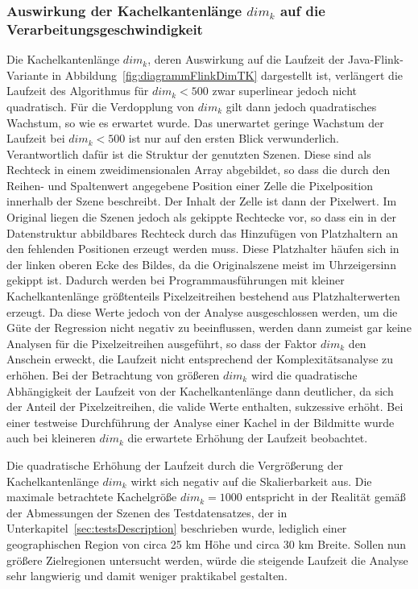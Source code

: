 \subsubsection{Auswirkung der Kachelkantenlänge $dim_k$ auf die Verarbeitungsgeschwindigkeit}
Die Kachelkantenlänge $dim_k$, deren Auswirkung auf die Laufzeit der Java-Flink-Variante in Abbildung~\ref{fig:diagrammFlinkDimTK} dargestellt ist, verlängert die Laufzeit des Algorithmus für $dim_k < 500$ zwar superlinear jedoch nicht quadratisch. Für die Verdopplung von $dim_k$ gilt dann jedoch quadratisches Wachstum, so wie es erwartet wurde. Das unerwartet geringe Wachstum der Laufzeit bei $dim_k < 500$ ist nur auf den ersten Blick verwunderlich. Verantwortlich dafür ist die Struktur der genutzten Szenen. Diese sind als Rechteck in einem zweidimensionalen Array abgebildet, so dass die durch den Reihen- und Spaltenwert angegebene Position einer Zelle die Pixelposition innerhalb der Szene beschreibt. Der Inhalt der Zelle ist dann der Pixelwert. Im Original liegen die Szenen jedoch als gekippte Rechtecke vor, so dass ein in der Datenstruktur abbildbares Rechteck durch das Hinzufügen von Platzhaltern an den fehlenden Positionen erzeugt werden muss. Diese Platzhalter häufen sich in der linken oberen Ecke des Bildes, da die Originalszene meist im Uhrzeigersinn gekippt ist. Dadurch werden bei Programmausführungen mit kleiner Kachelkantenlänge größtenteils Pixelzeitreihen bestehend aus Platzhalterwerten erzeugt. Da diese Werte jedoch von der Analyse ausgeschlossen werden, um die Güte der Regression nicht negativ zu beeinflussen, werden dann zumeist gar keine Analysen für die Pixelzeitreihen ausgeführt, so dass der Faktor $dim_k$ den Anschein erweckt, die Laufzeit nicht entsprechend der Komplexitätsanalyse zu erhöhen. Bei der Betrachtung von größeren $dim_k$ wird die quadratische Abhängigkeit der Laufzeit von der Kachelkantenlänge dann deutlicher, da sich der Anteil der Pixelzeitreihen, die valide Werte enthalten, sukzessive erhöht. Bei einer testweise Durchführung der Analyse einer Kachel in der Bildmitte wurde auch bei kleineren $dim_k$ die erwartete Erhöhung der Laufzeit beobachtet.

Die quadratische Erhöhung der Laufzeit durch die Vergrößerung der Kachelkantenlänge $dim_k$ wirkt sich negativ auf die Skalierbarkeit aus. Die maximale betrachtete Kachelgröße $dim_k = 1000$ entspricht in der Realität gemäß der Abmessungen der Szenen des Testdatensatzes, der in Unterkapitel~\ref{sec:testsDescription} beschrieben wurde, lediglich einer geographischen Region von circa 25 km Höhe und circa 30 km Breite. Sollen nun größere Zielregionen untersucht werden, würde die steigende Laufzeit die Analyse sehr langwierig und damit weniger praktikabel gestalten. 


